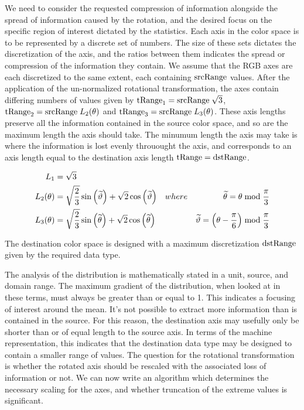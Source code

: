 We need to consider the requested compression of information alongside the spread of information caused by the rotation, and the desired focus on the specific region of interest dictated by the statistics. Each axis in the color space is to be represented by a discrete set of numbers. The size of these sets dictates the discretization of the axis, and the ratios between them indicates the spread or compression of the information they contain. We assume that the RGB axes are each discretized to the same extent, each containing $\text{srcRange}$ values. After the application of the un-normalized rotational transformation, the axes contain differing numbers of values given by $\text{tRange}_1 =\text{srcRange} \; \sqrt{3} $, $\text{tRange}_2 = \text{srcRange} \; L_2(\theta) $  and $\text{tRange}_3 = \text{srcRange} \; L_3(\theta)$. These axis lengths preserve all the information contained in the source color space, and so are the maximum length the axis should take. The minumum length the axis may take is where the information is lost evenly throuought the axis, and corresponds to an axis length equal to the destination axis length $\text{tRange} = \text{dstRange}$. 

\begin{align}
L_1 &= \sqrt{3} \\
L_2(\theta)  &= \sqrt{\frac{2}{3}} \sin \left(\widetilde{\vartheta}\right) + \sqrt{2} \cos \left(\widetilde{\vartheta}\right)  & where & & \widetilde{\theta} = \theta  \bmod \frac{\pi }{3} \\
L_3(\theta)  &= \sqrt{\frac{2}{3}} \sin \left(\widetilde{\theta}\right) + \sqrt{2} \cos \left(\widetilde{\theta}\right) & & & \widetilde{\vartheta} = \left(\theta - \frac{\pi}{6}\right) \bmod \frac{\pi }{3}
\end{align}

The destination color space is designed with a maximum discretization $\text{dstRange}$ given by the required data type.

The analysis of the distribution is mathematically stated in a unit, source, and domain range. The maximum gradient of the distribution, when looked at in these terms, must always be greater than or equal to 1. This indicates a focusing of interest around the mean. It's not possible to extract more information than is contained in the source. For this reason, the destination axis may usefully only be shorter than or of equal length to the source axis. In terms of the machine representation, this indicates that the destination data type may be designed to contain a smaller range of values. The question for the rotational transformation is whether the rotated axis should be rescaled with the associated loss of information or not. We can now write an algorithm which determines the necessary scaling for the axes, and whether truncation of the extreme values is significant.

